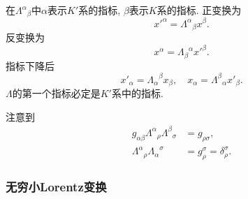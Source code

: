 \documentclass[hidelinks]{ctexart}
\begin{document}
在${\Lambda^\alpha}_\beta$中$\alpha$表示$K'$系的指标, $\beta$表示$K$系的指标. 正变换为
\[ x'^\alpha = {\Lambda^\alpha}_\beta x^\beta. \]
反变换为
\[ x^\alpha = {\Lambda_\beta}^\alpha x'^\beta. \]
指标下降后
\[ x'_\alpha = {\Lambda_\alpha}^\beta x_\beta,\quad x_\alpha = {\Lambda^\beta}_\alpha x'_\beta. \]
$\Lambda$的第一个指标必定是$K'$系中的指标.
\par
注意到
\begin{align*}
    g_{\alpha\beta}{\Lambda^\alpha}_\rho {\Lambda^\beta}_\sigma &= g_{\rho\sigma}, \\
    {\Lambda^\alpha}_\rho {\Lambda_\alpha}^\sigma &= g_\rho^\sigma = \delta_\rho^\sigma.
\end{align*}


\subsubsection{无穷小Lorentz变换} %
\label{ssub:无穷小lorentz变换}
\end{document}

